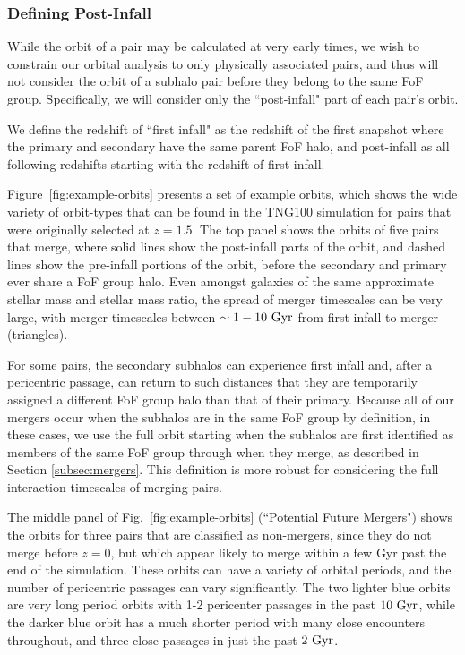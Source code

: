 \documentclass[twocolumn,linenumbers]{aastex631}
\begin{document}
\subsubsection{Defining Post-Infall}
While the orbit of a pair may be calculated at very early times, we wish to constrain our orbital analysis to only physically associated pairs, and thus will not consider the orbit of a subhalo pair before they belong to the same FoF group. 
Specifically, we will consider only the ``post-infall" part of each pair's orbit. 

We define the redshift of ``first infall" as the redshift of the first snapshot where the primary and secondary have the same parent FoF halo, and post-infall as all following redshifts starting with the redshift of first infall. 

Figure~\ref{fig:example-orbits} presents a set of example orbits, which shows the wide variety of orbit-types that can be found in the TNG100 simulation for pairs that were originally selected at $z=1.5$. 
The top panel shows the orbits of five pairs that merge, where solid lines show the post-infall parts of the orbit, and dashed lines show the pre-infall portions of the orbit, before the secondary and primary ever share a FoF group halo. 
Even amongst galaxies of the same approximate stellar mass and stellar mass ratio, the spread of merger timescales can be very large, with merger timescales between $\sim1-10\,\mathrm{\,Gyr}$ from first infall to merger (triangles). 

For some pairs, the secondary subhalos can experience first infall and, after a pericentric passage, can return to such distances that they are temporarily assigned a different FoF group halo than that of their primary. 
Because all of our mergers occur when the subhalos are in the same FoF group by definition, in these cases, we use the full orbit starting when the subhalos are first identified as members of the same FoF group through when they merge, as described in Section \ref{subsec:mergers}.
This definition is more robust for considering the full interaction timescales of merging pairs.

The middle panel of Fig.~\ref{fig:example-orbits} (``Potential Future Mergers") shows the orbits for three pairs that are classified as non-mergers, since they do not merge before $z=0$, but which appear likely to merge within a few Gyr past the end of the simulation. 
These orbits can have a variety of orbital periods, and the number of pericentric passages can vary significantly. 
The two lighter blue orbits are very long period orbits with 1-2 pericenter passages in the past $10\,\mathrm{\,Gyr}$, while the darker blue orbit has a much shorter period with many close encounters throughout, and three close passages in just the past $2\,\mathrm{\,Gyr}$.
\end{document}
